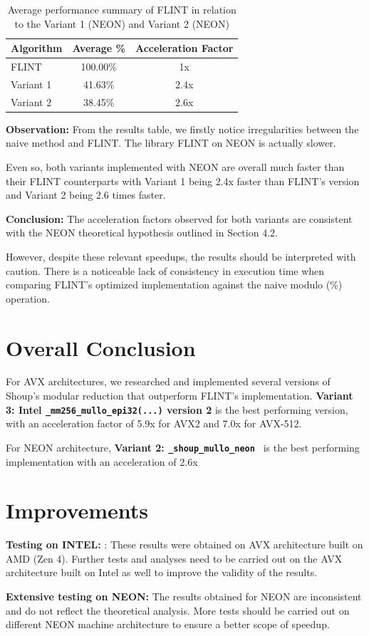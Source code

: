 \documentclass{article}
\newcommand{\pointlabel}[1]{\par\smallskip\noindent\textbf{\textcolor{accentorange}{#1:}} }
\begin{document}
\begin{table}[H]
    \centering
    \begin{tabular}{|l|c|c|}
        \hline
        Algorithm & Average \% & Acceleration Factor \\ \hline
        FLINT     & 100.00\%   & 1x                  \\
        Variant 1 & 41.63\%    & 2.4x                \\
        Variant 2 & 38.45\%    & 2.6x                \\
        \hline
    \end{tabular}
    \caption{Average performance summary of FLINT in relation to the Variant 1 (NEON) and Variant 2 (NEON)}
\end{table}

\pointlabel{Observation} From the results table, we firstly notice irregularities between the naive method and FLINT. The library FLINT on NEON is actually slower.

Even so, both variants implemented with NEON are overall much faster than their FLINT counterparts with Variant 1 being 2.4x faster than FLINT's version and Variant 2 being 2.6 times faster.
\pointlabel{Conclusion} The acceleration factors observed for both variants are consistent with the NEON theoretical hypothesis outlined in Section 4.2.

However, despite these relevant speedups, the results should be interpreted with caution. There is a noticeable lack of consistency in execution time when comparing FLINT's optimized implementation against the naive modulo (\%) operation.

\section{Overall Conclusion}
For AVX architectures, we researched and implemented several versions of Shoup's modular reduction that outperform FLINT's implementation. \textbf{Variant 3: Intel \texttt{\_mm256\_mullo\_epi32(...)} version 2} is the best performing version, with an acceleration factor of 5.9x for AVX2 and 7.0x for AVX-512.

For NEON architecture, \textbf{Variant 2: \texttt{\_shoup\_mullo\_neon }} is the best performing implementation with an acceleration of 2.6x


\section{Improvements}
\pointlabel{Testing on INTEL}: These results were obtained on AVX architecture built on AMD (Zen 4). Further tests and analyses need to be carried out on the AVX architecture built on Intel as well to improve the validity of the results.
\pointlabel{Extensive testing on NEON} The results obtained for NEON are inconsistent and do not reflect the theoretical analysis. More tests should be carried out on different NEON machine architecture to ensure a better scope of speedup.
\end{document}
